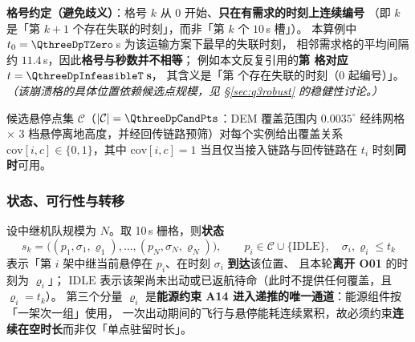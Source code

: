 \documentclass[12pt,a4paper,fontset=windows]{ctexart}
\begin{document}
\noindent\textbf{格号约定（避免歧义）}：格号 $k$ 从 $0$ 开始、\textbf{只在有需求的时刻上连续编号}
（即 $k$ 是「第 $k+1$ 个存在失联的时刻」，而非「第 $k$ 个 $10$\,s 槽」）。
本算例中 $t_0=\QthreeDpTZero$\,s 为该运输方案下最早的失联时刻，
相邻需求格的平均间隔约 $11.4$\,s，因此\textbf{格号与秒数并不相等}；
例如本文反复引用的\textbf{第 \QthreeDpInfeasibleCell{} 格对应 $t=\QthreeDpInfeasibleT$\,s}，
其含义是「第 \QthreeDpInfeasibleCell{} 个存在失联的时刻（0 起编号）」。
\emph{（该崩溃格的具体位置依赖候选点规模，见 \S\ref{sec:q3robust} 的稳健性讨论。）}

候选悬停点集 $\mathcal{C}$（$|\mathcal{C}|=\QthreeDpCandPts$：DEM 覆盖范围内 $0.0035^\circ$ 经纬网格
$\times$ 3 档悬停离地高度，并经回传链路预筛）对每个实例给出覆盖关系
$\mathrm{cov}[i,c]\in\{0,1\}$，其中 $\mathrm{cov}[i,c]=1$ 当且仅当接入链路与回传链路在 $t_i$ 时刻\textbf{同时}可用。

\subsubsection{状态、可行性与转移}\label{sec:q3dp}
设中继机队规模为 $N$。取 10\,s 栅格，则\textbf{状态}
\begin{equation}\label{eq:dpstate}\tag{S}
s_k=\big((p_1,\sigma_1,\varrho_1),\dots,(p_N,\sigma_N,\varrho_N)\big),\qquad
p_i\in\mathcal{C}\cup\{\mathrm{IDLE}\},\quad \sigma_i,\varrho_i\le t_k
\end{equation}
表示「第 $i$ 架中继当前悬停在 $p_i$、在时刻 $\sigma_i$ \textbf{到达}该位置、
且本轮\textbf{离开 O01} 的时刻为 $\varrho_i$」；
$\mathrm{IDLE}$ 表示该架尚未出动或已返航待命（此时不提供任何覆盖，且 $\varrho_i=t_k$）。
第三个分量 $\varrho_i$ 是\textbf{能源约束 A14 进入递推的唯一通道}：能源组件按「一架次一组」使用，
一次出动期间的飞行与悬停能耗连续累积，故必须约束\textbf{连续在空时长}而非仅「单点驻留时长」。
\end{document}
